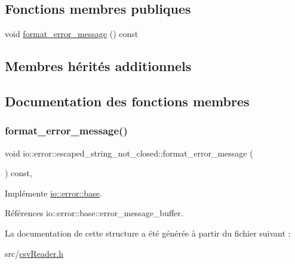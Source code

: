 \subsection*{Fonctions membres publiques}
\begin{DoxyCompactItemize}
\item 
void \hyperlink{structio_1_1error_1_1escaped__string__not__closed_a696911cd3cfaf8a30a728101b076028d}{format\+\_\+error\+\_\+message} () const
\end{DoxyCompactItemize}
\subsection*{Membres hérités additionnels}


\subsection{Documentation des fonctions membres}
\mbox{\label{structio_1_1error_1_1escaped__string__not__closed_a696911cd3cfaf8a30a728101b076028d}} 
\subsubsection{\texorpdfstring{format\+\_\+error\+\_\+message()}{format\_error\_message()}}
{\footnotesize\ttfamily void io\+::error\+::escaped\+\_\+string\+\_\+not\+\_\+closed\+::format\+\_\+error\+\_\+message (\begin{DoxyParamCaption}{ }\end{DoxyParamCaption}) const\hspace{0.3cm}{\ttfamily [inline]}, {\ttfamily [virtual]}}



Implémente \hyperlink{structio_1_1error_1_1base_a7d9ff6a31b716a24f056cf8a3e15191d}{io\+::error\+::base}.



Références io\+::error\+::base\+::error\+\_\+message\+\_\+buffer.



La documentation de cette structure a été générée à partir du fichier suivant \+:\begin{DoxyCompactItemize}
\item 
src/\hyperlink{csvReader_8h}{csv\+Reader.\+h}\end{DoxyCompactItemize}
